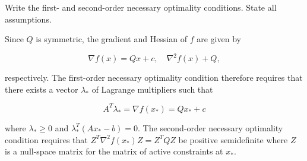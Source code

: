 Write the first- and second-order necessary optimality conditions. State all assumptions.

\begin{solution}
    Since $Q$ is symmetric, the gradient and Hessian of $f$ are given by 

    $$
    \nabla f(x) = Qx + c, \quad \nabla^2 f(x) + Q,
    $$

    respectively. The first-order necessary optimality condition therefore requires that there exists a vector 
    $\lambda_*$ of Lagrange multipliers such that

    $$
    A^T \lambda_* = \nabla f(x_*) = Qx_* + c
    $$

    where $\lambda_* \ge 0$ and $\lambda_*^T (A x_* - b) = 0$. The second-order necessary optimality condition requires
    that $Z^T \nabla^2 f(x_*) Z = Z^T Q Z$ be positive semidefinite where $Z$ is a null-space matrix for the matrix of 
    active constraints at $x_*$. 
    \ \\
\end{solution}